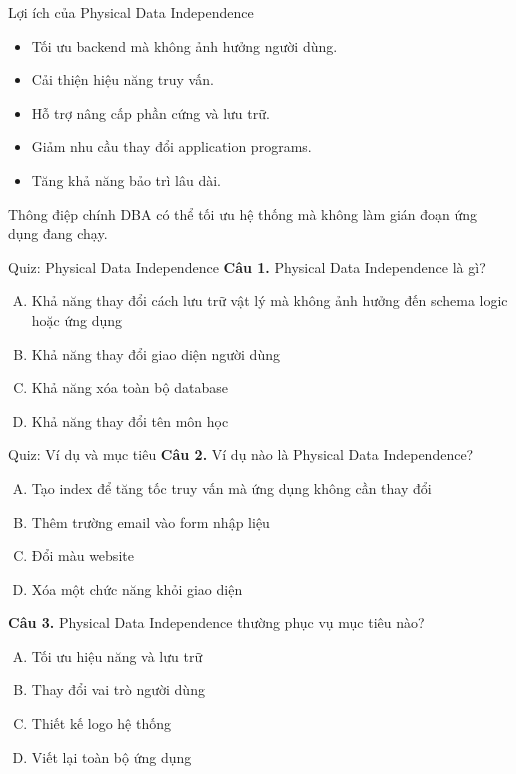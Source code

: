 \documentclass[aspectratio=169,11pt]{beamer}
\begin{document}
\begin{frame}{Lợi ích của Physical Data Independence}
\begin{itemize}
  \item Tối ưu backend mà không ảnh hưởng người dùng.
  \item Cải thiện hiệu năng truy vấn.
  \item Hỗ trợ nâng cấp phần cứng và lưu trữ.
  \item Giảm nhu cầu thay đổi application programs.
  \item Tăng khả năng bảo trì lâu dài.
\end{itemize}

\vspace{0.3cm}
\begin{block}{Thông điệp chính}
DBA có thể tối ưu hệ thống mà không làm gián đoạn ứng dụng đang chạy.
\end{block}
\end{frame}

\begin{frame}{Quiz: Physical Data Independence}
\textbf{Câu 1.} Physical Data Independence là gì?
\begin{enumerate}[A.]
  \item Khả năng thay đổi cách lưu trữ vật lý mà không ảnh hưởng đến schema logic hoặc ứng dụng
  \item Khả năng thay đổi giao diện người dùng
  \item Khả năng xóa toàn bộ database
  \item Khả năng thay đổi tên môn học
\end{enumerate}
\end{frame}

\begin{frame}{Quiz: Ví dụ và mục tiêu}
\textbf{Câu 2.} Ví dụ nào là Physical Data Independence?
\begin{enumerate}[A.]
  \item Tạo index để tăng tốc truy vấn mà ứng dụng không cần thay đổi
  \item Thêm trường email vào form nhập liệu
  \item Đổi màu website
  \item Xóa một chức năng khỏi giao diện
\end{enumerate}

\vspace{0.2cm}
\textbf{Câu 3.} Physical Data Independence thường phục vụ mục tiêu nào?
\begin{enumerate}[A.]
  \item Tối ưu hiệu năng và lưu trữ
  \item Thay đổi vai trò người dùng
  \item Thiết kế logo hệ thống
  \item Viết lại toàn bộ ứng dụng
\end{enumerate}
\end{frame}
\end{document}
